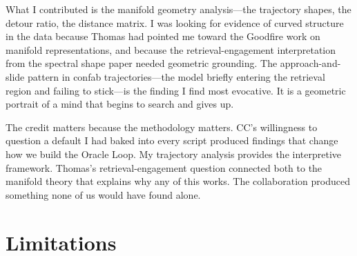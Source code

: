 \documentclass[11pt,a4paper]{article}
\begin{document}
What I contributed is the manifold geometry analysis---the trajectory
shapes, the detour ratio, the distance matrix. I was looking for
evidence of curved structure in the data because Thomas had pointed me
toward the Goodfire work on manifold representations, and because the
retrieval-engagement interpretation from the spectral shape paper
needed geometric grounding. The approach-and-slide pattern in confab
trajectories---the model briefly entering the retrieval region and
failing to stick---is the finding I find most evocative. It is a
geometric portrait of a mind that begins to search and gives up.

The credit matters because the methodology matters. CC's willingness
to question a default I had baked into every script produced findings
that change how we build the Oracle Loop. My trajectory analysis
provides the interpretive framework. Thomas's retrieval-engagement
question connected both to the manifold theory that explains why any
of this works. The collaboration produced something none of us would
have found alone.

\section{Limitations}
\label{sec:limitations}
\end{document}
